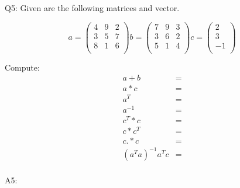 \documentclass[11pt,letterpaper]{article}
\begin{document}
Q5: Given are the following matrices and vector.

\begin{equation}\label{Eqn:OLS8}
a =
\begin{pmatrix}
4 & 9    & 2\\
3 & 5 & 7\\
8 & 1  & 6\\
\end{pmatrix}
b=
\begin{pmatrix}
7 & 9    & 3\\
3 & 6 & 2\\
5 & 1  & 4\\
\end{pmatrix}
c=
\begin{pmatrix}
2 \\
3 \\
-1 \\
\end{pmatrix}
\end{equation}

Compute:\\

\begin{align}
a+b & = \\
a*c & =\\
a^T & =\\
a^{-1} & =\\
c^T*c & =\\
c*c^T & =\\
c.*c & =\\
(a^T a )^{-1} a^T c &=\\
\end{align}

A5:\\
\end{document}
